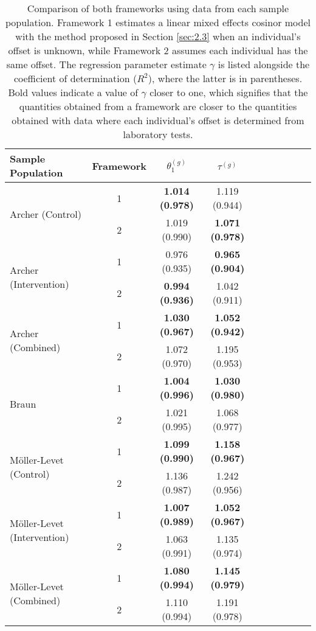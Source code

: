 \clearpage
\newpage



\begin{table*}[!h]
	\caption{Comparison of both frameworks using data from each sample population. Framework 1 estimates a linear mixed effects cosinor model with the method proposed in Section \ref{sec:2.3} when an individual's offset is unknown, while Framework 2 assumes each individual has the same offset. The regression parameter estimate $\gamma$ is listed alongside the coefficient of determination ($R^2$), where the latter is in parentheses. Bold values indicate a value of $\gamma$ closer to one, which signifies that the quantities obtained from a framework are closer to the quantities obtained with data where each individual's offset is determined from laboratory tests.} \label{tab:app}
  \centering
		\begin{tabular}{|l|c|c|c|c|c|c|c|c|c|}
			\hline
   \multirow{1}{*}{Sample Population} & \multirow{1}{*}{Framework}  &  \multicolumn{1}{c|}{$\theta^{(g)}_1$} & \multicolumn{1}{c|}{$\tau^{(g)}$} \\
   \hline
         \multirow{2}{*}{Archer (Control)} & 1 & \textbf{1.014 (0.978)} & 1.119 (0.944) \\ 
        & 2 & 1.019 (0.990) & \textbf{1.071 (0.978)} \\ 
         \hline 
         \multirow{2}{*}{Archer (Intervention)} & 1 & 0.976 (0.935) & \textbf{0.965 (0.904)} \\ 
    & 2 & \textbf{0.994 (0.936)} & 1.042 (0.911) \\
         \hline 
         \multirow{2}{*}{Archer (Combined)}& 1 & \textbf{1.030 (0.967)} & \textbf{1.052 (0.942)} \\
         & 2 & 1.072 (0.970) & 1.195 (0.953) \\
         \hline 
         \multirow{2}{*}{Braun} & 1 & \textbf{1.004 (0.996)} & \textbf{1.030 (0.980)} \\
         & 2 & 1.021 (0.995) & 1.068 (0.977) \\
         \hline 
         \multirow{2}{*}{M\"{o}ller-Levet (Control)} & 1 & \textbf{1.099 (0.990)} & \textbf{1.158 (0.967)} \\ 
         & 2 & 1.136 (0.987) & 1.242 (0.956) \\
         \hline 
         \multirow{2}{*}{M\"{o}ller-Levet (Intervention)} & 1 & \textbf{1.007 (0.989)} & \textbf{1.052 (0.967)} \\ 
         & 2 & 1.063 (0.991) & 1.135 (0.974) \\
         \hline 
         \multirow{2}{*}{M\"{o}ller-Levet (Combined)} & 1 & \textbf{1.080 (0.994)} & \textbf{1.145 (0.979)} \\ 
         & 2 & 1.110 (0.994) & 1.191 (0.978) \\
         \hline 
\end{tabular} \end{table*}


